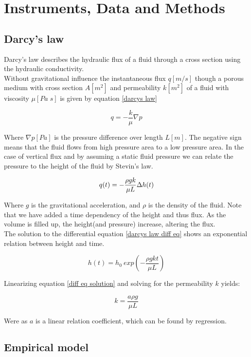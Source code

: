 \section{Instruments, Data and Methods} \label{sec:methods}

\subsection{Darcy's law}

Darcy's law describes the hydraulic flux of a fluid through a cross section using the hydraulic conductivity.\\
Without gravitational influence the instantaneous flux $q[m/s]$ though a porous medium with cross section $A[m^2]$ and permeability $k[m^2]$ of a fluid with viscosity $\mu[Pa \; s]$ is given by equation \ref{darcys law}

\begin{equation}\label{darcys law}
    q = -\frac{k}{\mu}\nabla p
\end{equation}

Where $\nabla p[Pa]$ is the pressure difference over length $L[m]$. The negative sign means that the fluid flows from high pressure area to a low pressure area. 
In the case of vertical flux and by assuming a static fluid pressure we can relate the pressure to the height of the fluid by Stevin's law.

\begin{equation}\label{darcys law diff eq}
    q(t) = -\frac{\rho g k}{\mu L}\Delta h(t) \\
\end{equation}

Where $g$ is the gravitational acceleration, and $\rho$ is the density of the fluid. Note that we have added a time dependency of the height and thus flux. As the volume is filled up, the height(and pressure) increase, altering the flux. \\ 
The solution to the differential equation \ref{darcys law diff eq} shows an exponential relation between height and time.  

\begin{equation}\label{diff eq solution}
    h(t) = h_0 \: exp\left(-\frac{\rho g k t}{\mu L}\right)
\end{equation}

Linearizing equation \ref{diff eq solution} and solving for the permeability $k$ yields:

\begin{equation}\label{lin.diff sol}
    k = \frac{a \rho g}{\mu L}
\end{equation}

Were as $a$ is a linear relation coefficient, which can be found by regression. 

\subsection{Empirical model}





